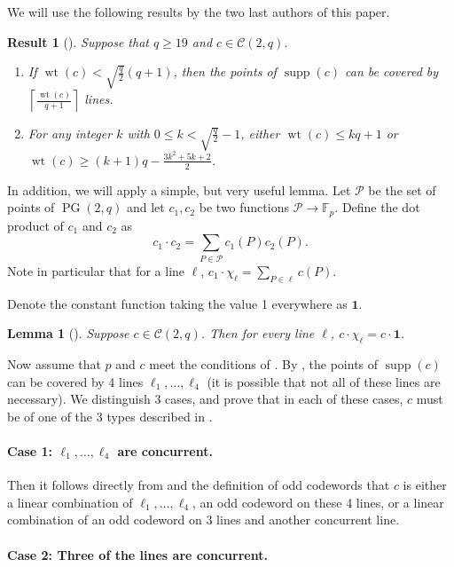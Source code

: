 \documentclass[12pt, a4paper]{article}
\newtheorem{lm}[thm]{Lemma}
\newtheorem{res}[thm]{Result}
\theoremstyle{definition}
\newcommand{\FF}{\mathbb F}
\newcommand{\one}{\mathbf 1}
\newcommand{\ceil}[1]{\left \lceil #1 \right \rceil}
\newcommand{\mc}{\mathcal C}
\renewcommand{\mp}{\mathcal P}
\DeclareMathOperator{\supp}{supp}
\DeclareMathOperator{\wt}{wt}
\DeclareMathOperator{\PG}{PG}
\newcommand{\pg}{\PG}
\begin{document}
We will use the following results by the two last authors of this paper.

\begin{res}[{\cite[Theorem 4.2, Corollary 4.9]{Szonyi:Weiner:14}}]
\label{SzW}
Suppose that $q \geq 19$ and $c \in \mc(2,q)$.
 \begin{enumerate}
  \item If $\wt(c) < \sqrt{\frac q2} (q+1)$, then the points of $\supp(c)$ can be covered by $\ceil{\frac{\wt(c)}{q+1}}$ lines.
  \item For any integer $k$ with $0 \leq k < \sqrt{\frac q2} - 1$, either $\wt(c) \leq k q + 1$ or $\wt(c) \geq (k+1)q - \frac{3k^2 + 5k + 2}2$.
 \end{enumerate}
\end{res}

In addition, we will apply a simple, but very useful lemma.
Let $\mp$ be the set of points of $\pg(2,q)$ and let $c_1, c_2$ be two functions $\mp \to \FF_p$.
Define the dot product of $c_1$ and $c_2$ as
\[
 c_1 \cdot c_2 = \sum_{P \in \mp} c_1(P) c_2(P).
\]
Note in particular that for a line $\ell$, $c_1 \cdot \chi_\ell = \sum_{P \in \ell} c(P)$.

Denote the constant function taking the value 1 everywhere as $\one$.

\begin{lm}[{\cite[Lemma 2]{LavrauwStormeVandeVoorde:08:I}}]
 Suppose $c \in \mc(2,q)$.
 Then for every line $\ell$, $c \cdot \chi_\ell = c \cdot \one$.
\end{lm}

Now assume that $p$ and $c$ meet the conditions of .
By , the points of $\supp(c)$ can be covered by 4 lines $\ell_1, \dots, \ell_4$ (it is possible that not all of these lines are necessary).
We distinguish 3 cases, and prove that in each of these cases, $c$ must be of one of the 3 types described in .

\paragraph{Case 1: $\ell_1, \dots, \ell_4$ are concurrent.}
Then it follows directly from  and the definition of odd codewords that $c$ is either a linear combination of $\ell_1, \dots, \ell_4$, an odd codeword on these 4 lines, or a linear combination of an odd codeword on 3 lines and another concurrent line.

\paragraph{Case 2: Three of the lines are concurrent.}
\end{document}
